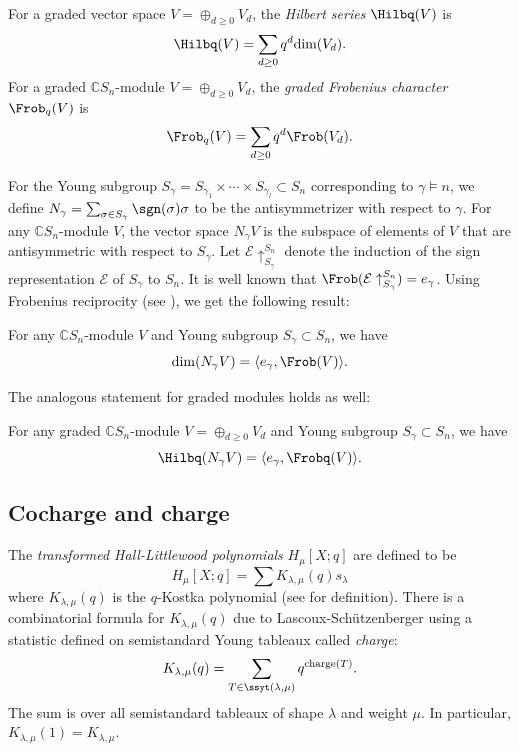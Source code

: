  For a graded vector space $V = \oplus_{d\geq0} V_d$, the   \textit{Hilbert series} $\Hilbq(V)$ is 
\[\Hilbq(V) = \sum\limits_{d\geq 0} q^d \text{dim}(V_d).\]
For a graded $\mathbb{C}S_n$-module $V = \oplus_{d\geq0} V_d$, the \textit{graded Frobenius character} $\Frob_q(V)$ is 
\[\Frob_q(V) = \sum\limits_{d \geq 0} q^d \Frob(V_d).\]

For the Young subgroup $S_\gamma = S_{\gamma_1} \times \cdots \times S_{\gamma_l}\subset S_n$ corresponding to $\gamma\models n$, we define $N_{\gamma} = \sum_{\sigma\in S_\gamma} \sgn(\sigma) \sigma$ to be the antisymmetrizer with respect to $\gamma$. 
For any $\mathbb{C}S_n$-module $V$, the vector space $N_\gamma V$ is the subspace of elements of $V$ that are antisymmetric with respect to $S_\gamma$.
Let $\mathcal{E}\uparrow^{S_n}_{S_\gamma}$ denote the induction of the sign representation $\mathcal{E}$ of $S_\gamma$ to $S_n$. It is well known that $\Frob(\mathcal{E}\uparrow^{S_n}_{S_\gamma}) = e_\gamma$. Using Frobenius reciprocity (see \cite[Chapter 3.3]{Fulton-Harris}), we get the following result:
\begin{prop}
    For any $\mathbb{C}S_n$-module $V$ and Young subgroup $S_\gamma \subset S_n$, we have  $$\dim(N_\gamma V) = \langle e_\gamma, \Frob(V)\rangle.$$
\end{prop}
The analogous statement for graded modules holds as well:
\begin{prop}\label{prop: dim and antisym}
    For any graded $\mathbb{C}S_n$-module $V = \oplus_{d\geq0} V_d$ and Young subgroup $S_\gamma \subset S_n$, we have  $$\Hilbq(N_\gamma V) = \langle e_\gamma, \Frobq(V)\rangle.$$
\end{prop}


\subsection{Cocharge and charge}\label{subsection:charge}
The \textit{transformed Hall-Littlewood polynomials} $H_\mu[X;q]$ are defined to be
\[H_\mu[X;q] = \sum K_{\lambda,\mu}(q) s_\lambda\]
where $K_{\lambda,\mu}(q)$ is the $q$-Kostka polynomial (see {\cite[Chapter III.6]{macdonald}} for definition). 
There is a combinatorial formula for $K_{\lambda,\mu}(q)$ due to Lascoux-Sch\"{u}tzenberger \cite{LS1} using a statistic defined on semistandard Young tableaux called \textit{charge}:
\[K_{\lambda,\mu}(q) = \sum\limits_{T\in \ssyt(\lambda,\mu)}  q^{\text{charge}(T)}.\] 
The sum is over all semistandard tableaux of shape $\lambda$ and weight $\mu$. In particular, $K_{\lambda,\mu}(1) = K_{\lambda,\mu}$.

